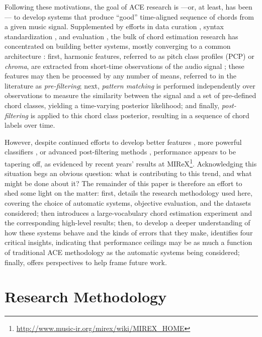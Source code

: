 \documentclass{article}
\begin{document}
Following these motivations, the goal of ACE research is ---or, at least, has been--- to develop systems that produce ``good'' time-aligned sequence of chords from a given music signal.
Supplemented by efforts in data curation \cite{Burgoyne2011Expert}, syntax standardization \cite{Harte2005Symbolic}, and evaluation \cite{Pauwels2013Evaluating}, the bulk of chord estimation research has concentrated on building better systems, mostly converging to a common architecture \cite{Cho2014Improved}:
first, harmonic features, referred to as pitch class profiles (PCP) or \emph{chroma}, are extracted from short-time observations of the audio signal \cite{Fujishima1999Realtime};
these features may then be processed by any number of means, referred to in the literature as \emph{pre-filtering};
next, \emph{pattern matching} is performed independently over observations to measure the similarity between the signal and a set of pre-defined chord classes, yielding a time-varying posterior likelihood;
and finally, \emph{post-filtering} is applied to this chord class posterior, resulting in a sequence of chord labels over time.

However, despite continued efforts to develop better features \cite{Mueller2010Towards}, more powerful classifiers \cite{Humphrey2012Rethinking}, or advanced post-filtering methods \cite{Boulanger2013Audio}, performance appears to be tapering off, as evidenced by recent years' results at MIReX\footnote{\url{http://www.music-ir.org/mirex/wiki/MIREX\_HOME}}.
Acknowledging this situation %
begs an obvious question:
what is contributing to this trend, and what might be done about it?
The remainder of this paper is therefore an effort to shed some light on the matter:
first,  details the research methodology used here, covering the choice of automatic systems, objective evaluation, and the datasets considered;
 then introduces a large-vocabulary chord estimation experiment and the corresponding high-level results;
then, to develop a deeper understanding of how these systems behave and the kinds of errors that they make,  identifies four critical insights, indicating that performance ceilings may be as much a function of traditional ACE methodology as the automatic systems being considered;
finally,  offers perspectives to help frame future work.


\section{Research Methodology}
\label{sec:method}
\end{document}
